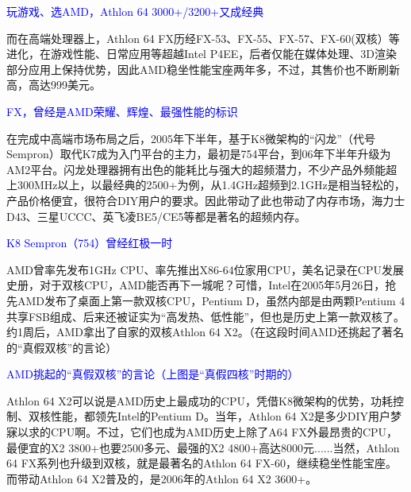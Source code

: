 \documentclass[utf8]{book}
\begin{document}
	\begin{flushleft}
		{\large \textcolor{blue}{玩游戏、选AMD，Athlon 64 3000+/3200+又成经典\\}}
	\end{flushleft}
	
	而在高端处理器上，Athlon 64 FX历经FX-53、FX-55、FX-57、FX-60(双核）等进化，在游戏性能、日常应用等超越Intel P4EE，后者仅能在媒体处理、3D渲染部分应用上保持优势，因此AMD稳坐性能宝座两年多，不过，其售价也不断刷新高，高达999美元。

	\begin{flushleft}
		{\large \textcolor{blue}{FX，曾经是AMD荣耀、辉煌、最强性能的标识}}
	\end{flushleft}
	

	在完成中高端市场布局之后，2005年下半年，基于K8微架构的“闪龙”（代号Sempron）取代K7成为入门平台的主力，最初是754平台，到06年下半年升级为AM2平台。闪龙处理器拥有出色的能耗比与强大的超频潜力，不少产品外频能超上300MHz以上，以最经典的2500+为例，从1.4GHz超频到2.1GHz是相当轻松的，产品价格便宜，很符合DIY用户的要求。因此带动了此也带动了内存市场，海力士D43、三星UCCC、英飞凌BE5/CE5等都是著名的超频内存。


	\begin{flushleft}
		{\large \textcolor{blue}{K8 Sempron（754）曾经红极一时\\}}
	\end{flushleft}

	AMD曾率先发布1GHz CPU、率先推出X86-64位家用CPU，美名记录在CPU发展史册，对于双核CPU，AMD能否再下一城呢？可惜，Intel在2005年5月26日，抢先AMD发布了桌面上第一款双核CPU，Pentium D，虽然内部是由两颗Pentium 4共享FSB组成、后来还被证实为“高发热、低性能”，但也是历史上第一款双核了。约1周后，AMD拿出了自家的双核Athlon 64 X2。（在这段时间AMD还挑起了著名的“真假双核”的言论）
	
	
	\begin{flushleft}
		{\large \textcolor{blue}{AMD挑起的“真假双核”的言论（上图是“真假四核”时期的）\\}}
	\end{flushleft}
	
	Athlon 64 X2可以说是AMD历史上最成功的CPU，凭借K8微架构的优势，功耗控制、双核性能，都领先Intel的Pentium D。当年，Athlon 64 X2是多少DIY用户梦寐以求的CPU啊。不过，它们也成为AMD历史上除了A64 FX外最昂贵的CPU，最便宜的X2 3800+也要2500多元、最强的X2 4800+高达8000元......当然，Athlon 64 FX系列也升级到双核，就是最著名的Athlon 64 FX-60，继续稳坐性能宝座。而带动Athlon 64 X2普及的，是2006年的Athlon 64 X2 3600+。
	
\end{document}
